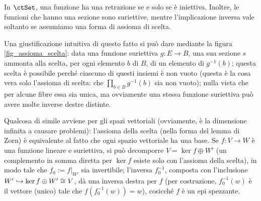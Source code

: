 \begin{example}
	\label{exm:set-sezioni-retrazioni}
	In \(\ctSet\), una funzione ha una retrazione se e solo se è iniettiva.
	Inoltre, le funzioni che hanno una sezione sono suriettive,
	mentre l'implicazione inversa vale soltanto se assumiamo una forma di assioma di scelta.

	Una giustificazione intuitiva di questo fatto si può dare mediante la figura \ref{fig_assioma_scelta}: data una funzione suriettiva \(g : E\to B\), una sua sezione \(s\) ammonta alla scelta, per ogni elemento \(b\) di \(B\), di un elemento di \(g^{-1}(b)\); questa scelta è possibile perché ciascuno di questi insiemi è non vuoto (questa è la cosa vera solo l'assioma di scelta: che \(\prod_{b\in B}g^{-1}(b)\) sia non vuoto); nulla vieta che per alcune fibre essa sia unica, ma ovviamente una stessa funzione suriettiva può avere molte inverse destre distinte.
\end{example}
\begin{remark}
	Qualcosa di simile avviene per gli spazi vettoriali (ovviamente, è la dimensione infinita a causare problemi): l'assioma della scelta (nella forma del lemma di Zorn) è equivalente al fatto che ogni spazio vettoriale ha una base. Se \(f : V\to W\) è una funzione lineare e suriettiva, si può decomporre \(V = \ker f \oplus W'\) (un complemento in somma diretta per \(\ker f\) esiste solo con l'assioma della scelta), in modo tale che \(f_0 := f|_{W'}\) sia invertibile; l'inversa \(f_0^{-1}\), composta con l'inclusione \(W'\hookrightarrow \ker f \oplus W'\cong V\), dà una inversa destra per \(f\) (per costruzione, \(f_0^{-1}(w)\) è il vettore (unico) tale che \(f(f_0^{-1}(w)) = w\)), cosicché \(f\) è un epi spezzante.
\end{remark}
